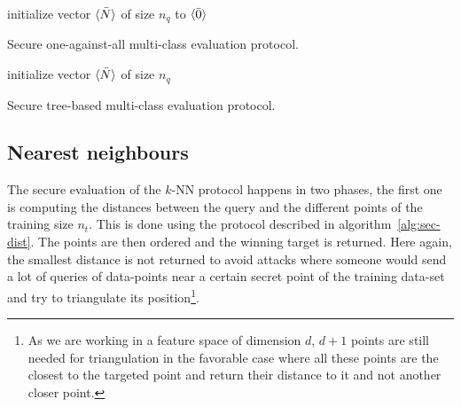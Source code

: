 \begin{center}
\begin{algorithm}[H]
\DontPrintSemicolon
initialize vector $\langle \bar{N} \rangle$ of size $n_q$ to $\langle \bar{0} \rangle$ \;
\caption{Secure one-against-all multi-class evaluation protocol.}
\label{alg:sec-multi1}
\end{algorithm}
\end{center}

\begin{center}
\begin{algorithm}[H]
\DontPrintSemicolon
initialize vector $\langle \bar{N} \rangle$ of size $n_q$ \;
\caption{Secure tree-based multi-class evaluation protocol.}
\label{alg:sec-multi2}
\end{algorithm}
\end{center}


\subsection{Nearest neighbours}
The secure evaluation of the $k$-NN protocol happens in two phases, the first one is computing the distances between the query and the different points of the training size $n_t$. This is done using the protocol described in algorithm~\ref{alg:sec-dist}. The points are then ordered and the winning target is returned. Here again, the smallest distance is not returned to avoid attacks where someone would send a lot of queries of data-points near a certain secret point of the training data-set and try to triangulate its position\footnote{As we are working in a feature space of dimension $d$, $d+1$ points are still needed for triangulation in the favorable case where all these points are the closest to the targeted point and return their distance to it and not another closer point.}.

